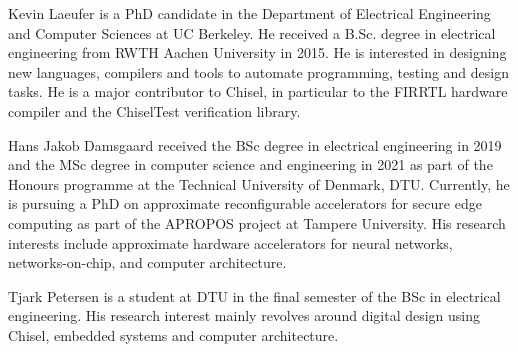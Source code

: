 \documentclass[conference]{IEEEtran}
\begin{document}
\begin{IEEEbiography}{Kevin Laeufer}
  is a PhD candidate in the Department of Electrical Engineering and Computer Sciences at UC Berkeley.
  He received a B.Sc. degree in electrical engineering from RWTH Aachen University in 2015.
  He is interested in designing new languages, compilers and tools to automate programming, testing and design tasks.
  He is a major contributor to Chisel, in particular to the FIRRTL hardware compiler and the ChiselTest verification library.
\end{IEEEbiography}

\begin{IEEEbiography}{Hans Jakob Damsgaard}
received the BSc degree in electrical engineering in 2019 and the MSc degree in
computer science and engineering in 2021 as part of the Honours programme at the
Technical University of Denmark, DTU. Currently, he is pursuing a PhD
on approximate reconfigurable accelerators for secure edge computing as part
of the APROPOS project at Tampere University. His research interests include
approximate hardware accelerators for neural networks, networks-on-chip, and computer architecture.
\end{IEEEbiography}

\begin{IEEEbiography}{Tjark Petersen}
  is a student at DTU in the final semester of the BSc in electrical engineering. 
  His research interest mainly revolves around digital design using Chisel, embedded systems and computer architecture.
\end{IEEEbiography}
\end{document}
